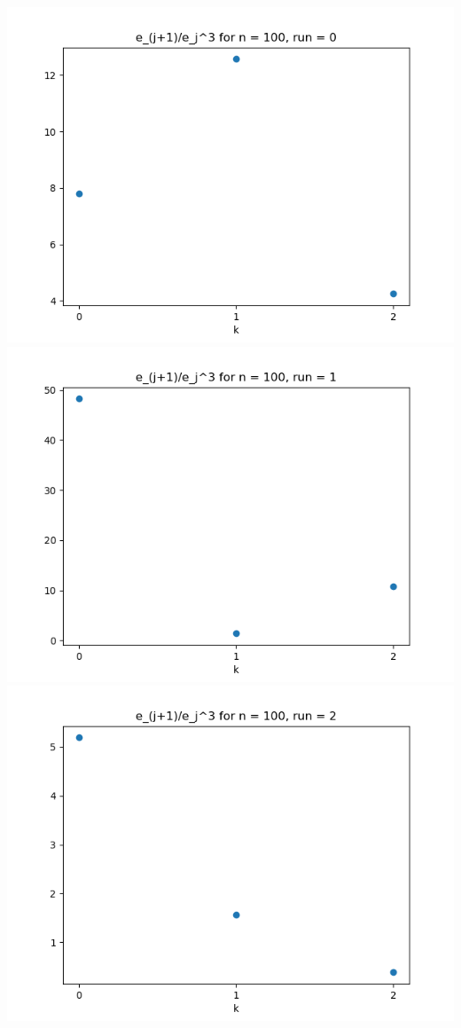 \documentclass{article}
\begin{document}
\begin{enumerate}
\begin{enumerate}
\begin{center}
			\includegraphics[scale=.4]{hw4 err n = 100 run = 0}
			\includegraphics[scale=.4]{hw4 err n = 100 run = 1}
			\includegraphics[scale=.4]{hw4 err n = 100 run = 2}

\end{center}
\end{enumerate}
\end{enumerate}
\end{document}
